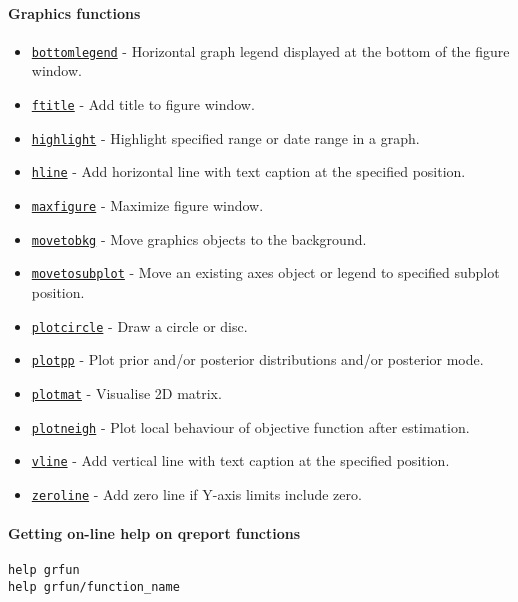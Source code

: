

	\paragraph{Graphics functions}

\begin{itemize}
\itemsep1pt\parskip0pt
\item
  \href{grfun/bottomlegend}{\texttt{bottomlegend}} - Horizontal graph
  legend displayed at the bottom of the figure window.
\item
  \href{grfun/ftitle}{\texttt{ftitle}} - Add title to figure window.
\item
  \href{grfun/highlight}{\texttt{highlight}} - Highlight specified range
  or date range in a graph.
\item
  \href{grfun/hline}{\texttt{hline}} - Add horizontal line with text
  caption at the specified position.
\item
  \href{grfun/maxfigure}{\texttt{maxfigure}} - Maximize figure window.
\item
  \href{grfun/movetobkg}{\texttt{movetobkg}} - Move graphics objects to
  the background.
\item
  \href{grfun/movetosubplot}{\texttt{movetosubplot}} - Move an existing
  axes object or legend to specified subplot position.
\item
  \href{grfun/plotcircle}{\texttt{plotcircle}} - Draw a circle or disc.
\item
  \href{grfun/plotpp}{\texttt{plotpp}} - Plot prior and/or posterior
  distributions and/or posterior mode.
\item
  \href{grfun/plotmat}{\texttt{plotmat}} - Visualise 2D matrix.
\item
  \href{grfun/plotneigh}{\texttt{plotneigh}} - Plot local behaviour of
  objective function after estimation.
\item
  \href{grfun/vline}{\texttt{vline}} - Add vertical line with text
  caption at the specified position.
\item
  \href{grfun/zeroline}{\texttt{zeroline}} - Add zero line if Y-axis
  limits include zero.
\end{itemize}

\paragraph{Getting on-line help on qreport
functions}

\begin{verbatim}
help grfun
help grfun/function_name
\end{verbatim}



